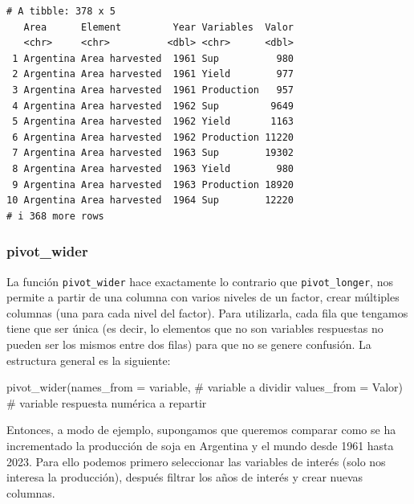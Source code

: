 \documentclass[
  letterpaper,
  DIV=11,
  numbers=noendperiod]{scrartcl}
\newenvironment{Shaded}{\begin{snugshade}}{\end{snugshade}}
\newcommand{\AttributeTok}[1]{\textcolor[rgb]{0.40,0.45,0.13}{#1}}
\newcommand{\CommentTok}[1]{\textcolor[rgb]{0.37,0.37,0.37}{#1}}
\newcommand{\FunctionTok}[1]{\textcolor[rgb]{0.28,0.35,0.67}{#1}}
\newcommand{\NormalTok}[1]{\textcolor[rgb]{0.00,0.23,0.31}{#1}}
\begin{document}
\begin{verbatim}
# A tibble: 378 x 5
   Area      Element         Year Variables  Valor
   <chr>     <chr>          <dbl> <chr>      <dbl>
 1 Argentina Area harvested  1961 Sup          980
 2 Argentina Area harvested  1961 Yield        977
 3 Argentina Area harvested  1961 Production   957
 4 Argentina Area harvested  1962 Sup         9649
 5 Argentina Area harvested  1962 Yield       1163
 6 Argentina Area harvested  1962 Production 11220
 7 Argentina Area harvested  1963 Sup        19302
 8 Argentina Area harvested  1963 Yield        980
 9 Argentina Area harvested  1963 Production 18920
10 Argentina Area harvested  1964 Sup        12220
# i 368 more rows
\end{verbatim}

\hypertarget{pivot_wider}{%
\subsubsection{pivot\_wider}\label{pivot_wider}}

La función \texttt{pivot\_wider} hace exactamente lo contrario que
\texttt{pivot\_longer}, nos permite a partir de una columna con varios
niveles de un factor, crear múltiples columnas (una para cada nivel del
factor). Para utilizarla, cada fila que tengamos tiene que ser única (es
decir, lo elementos que no son variables respuestas no pueden ser los
mismos entre dos filas) para que no se genere confusión. La estructura
general es la siguiente:

\begin{Shaded}
\begin{Highlighting}[]
\FunctionTok{pivot\_wider}\NormalTok{(}\AttributeTok{names\_from =}\NormalTok{ variable, }\CommentTok{\# variable a dividir}
       \AttributeTok{values\_from =}\NormalTok{ Valor) }\CommentTok{\# variable respuesta numérica a repartir}
\end{Highlighting}
\end{Shaded}

Entonces, a modo de ejemplo, supongamos que queremos comparar como se ha
incrementado la producción de soja en Argentina y el mundo desde 1961
hasta 2023. Para ello podemos primero seleccionar las variables de
interés (solo nos interesa la producción), después filtrar los años de
interés y crear nuevas columnas.
\end{document}
